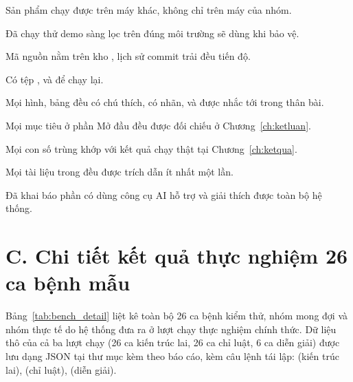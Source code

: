 \begin{tukiem}
  \item Sản phẩm chạy được trên máy khác, không chỉ trên máy của nhóm.
  \item Đã chạy thử demo sàng lọc trên đúng môi trường sẽ dùng khi bảo vệ.
  \item Mã nguồn nằm trên kho , lịch sử commit trải đều tiến độ.
  \item Có tệp ,  và  để chạy lại.
  \item Mọi hình, bảng đều có chú thích, có nhãn, và được nhắc tới trong thân bài.
  \item Mọi mục tiêu ở phần Mở đầu đều được đối chiếu ở
        Chương~\ref{ch:ketluan}.
  \item Mọi con số trùng khớp với kết quả chạy thật tại Chương~\ref{ch:ketqua}.
  \item Mọi tài liệu trong  đều được trích dẫn ít nhất một lần.
  \item Đã khai báo phần có dùng công cụ AI hỗ trợ và giải thích được toàn bộ hệ thống.
\end{tukiem}

\section*{C. Chi tiết kết quả thực nghiệm 26 ca bệnh mẫu}
{}

Bảng~\ref{tab:bench_detail} liệt kê toàn bộ 26 ca bệnh kiểm thử, nhóm mong đợi
và nhóm thực tế do hệ thống đưa ra ở lượt chạy thực nghiệm chính thức. Dữ liệu
thô của cả ba lượt chạy (26 ca kiến trúc lai, 26 ca chỉ luật, 6 ca diễn giải)
được lưu dạng JSON tại thư mục  kèm theo báo cáo, kèm câu
lệnh tái lập:  (kiến trúc lai),
 (chỉ luật),
 (diễn giải).

